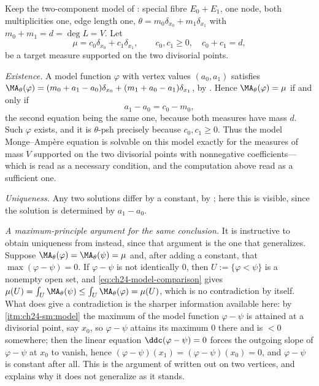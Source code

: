 \begin{example}
\label{ex:ch24-uniqueness-curve}
Keep the two-component model of : special fibre
\(E_0+E_1\), one node, both multiplicities one, edge length one,
\(\theta=m_0\delta_{x_0}+m_1\delta_{x_1}\) with \(m_0+m_1=d=\deg L=V\).
Let
\[
 \mu=c_0\delta_{x_0}+c_1\delta_{x_1},
 \qquad c_0,c_1\geq0,\quad c_0+c_1=d ,
\]
be a target measure supported on the two divisorial points.

\emph{Existence.}  A model function \(\varphi\) with vertex values
\((a_0,a_1)\) satisfies
\(\MA_\theta(\varphi)=(m_0+a_1-a_0)\delta_{x_0}+(m_1+a_0-a_1)\delta_{x_1}\),
by .  Hence \(\MA_\theta(\varphi)=\mu\) if and only
if
\[
 a_1-a_0=c_0-m_0 ,
\]
the second equation being the same one, because both measures have mass
\(d\).  Such \(\varphi\) exists, and it is \(\theta\)-psh precisely because
\(c_0,c_1\geq0\).  Thus the model Monge--Amp\`ere equation is solvable on
this model exactly for the measures of mass \(V\) supported on the two
divisorial points with nonnegative coefficients---which is
 read as a necessary condition, and the computation
above read as a sufficient one.

\emph{Uniqueness.}  Any two solutions differ by a constant, by
; here this is visible, since the
solution is determined by \(a_1-a_0\).

\emph{A maximum-principle argument for the same conclusion.}  It is
instructive to obtain uniqueness from
 instead, since that argument is the one
that generalizes.  Suppose \(\MA_\theta(\varphi)=\MA_\theta(\psi)=\mu\) and,
after adding a constant, that \(\max(\varphi-\psi)=0\).  If
\(\varphi-\psi\) is not identically \(0\), then
\(U:=\{\varphi<\psi\}\) is a nonempty open set, and
\eqref{eq:ch24-model-comparison} gives
\(\mu(U)=\int_U\MA_\theta(\psi)\leq\int_U\MA_\theta(\varphi)=\mu(U)\), which
is no contradiction by itself.  What does give a contradiction is the
sharper information available here: by
\,\cref{itm:ch24-sm:model} the maximum of
the model function \(\varphi-\psi\) is attained at a divisorial point, say
\(x_0\), so \(\varphi-\psi\) attains its maximum \(0\) there and is
\(<0\) somewhere; then the linear equation \(\ddc(\varphi-\psi)=0\) forces
the outgoing slope of \(\varphi-\psi\) at \(x_0\) to vanish, hence
\((\varphi-\psi)(x_1)=(\varphi-\psi)(x_0)=0\), and \(\varphi-\psi\) is
constant after all.  This is the argument of
 written out on two vertices, and
 explains why it does not generalize as it
stands.


\end{example}

